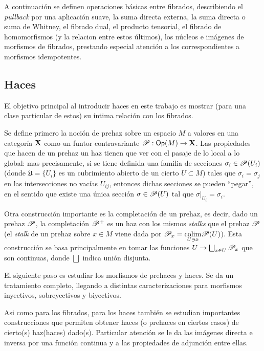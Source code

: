{A continuaci\'on se definen operaciones b\'asicas entre fibrados, describiendo el \emph{pullback} por una aplicaci\'on suave, la suma directa externa, la suma directa o suma de Whitney, el fibrado dual, el producto tensorial, el fibrado de homomorfismos (y la relacion entre estos \'ultimos), los n\'ucleos e im\'agenes de morfismos de fibrados, prestando especial atenci\'on a los correspondientes a morfismos idempotentes.

\subsection{Haces}

El objetivo principal al introducir haces en este trabajo es mostrar (para una clase particular de estos) su \'intima relaci\'on con los fibrados.

Se define primero la noci\'on de prehaz sobre un espacio $M$ a valores en una categor\'ia ${\bf X}$ como un funtor contravariante $\mathscr{P}:\mathsf{Op}(M)\to {\bf X}$. Las propiedades que hacen de un prehaz un haz tienen que ver con el pasaje de lo local a lo global: mas precisamente, si se tiene definida una familia de secciones $\sigma_i\in \mathscr{P}(U_i)$ (donde $\mathfrak{U}=\{U_i\}$ es un cubrimiento abierto de un cierto $U\subset M$) tales que $\sigma_i=\sigma_j$ en las intersecciones no vac\'ias $U_{ij}$, entonces dichas secciones se pueden ``pegar'', en el sentido que existe una \'unica secci\'on $\sigma \in \mathscr{P}(U)$ tal que $\sigma |_{U_i}=\sigma_i$.

Otra construcci\'on importante es la completaci\'on de un prehaz, es decir, dado un prehaz $\mathscr{P}$, la completaci\'on $\mathscr{P}^+$ es un haz con los mismos \emph{stalks} que el prehaz $\mathscr{P}$ (el \emph{stalk} de un prehaz sobre $x\in M$ viene dada por $\mathscr{P}_x=\underset{U\ni x}{\operatorname{colim}}\mathscr{P}(U)$). Esta construcci\'on se basa principalmente en tomar las funciones $U\to \bigsqcup_{x\in U}\mathscr{P}_x$ que son continuas, donde $\bigsqcup$ indica uni\'on disjunta.

El siguiente paso es estudiar los morfismos de prehaces y haces. Se da un tratamiento completo, llegando a distintas caracterizaciones para morfismos inyectivos, sobreyectivos y biyectivos.

Asi como para los fibrados, para los haces tambi\'en se estudian importantes construcciones que permiten obtener haces (o prehaces en ciertos casos) de cierto(s) haz(haces) dado(s). Particular atenci\'on se le da las im\'agenes directa e inversa por una funci\'on continua y a las propiedades de adjunci\'on entre ellas.

}

